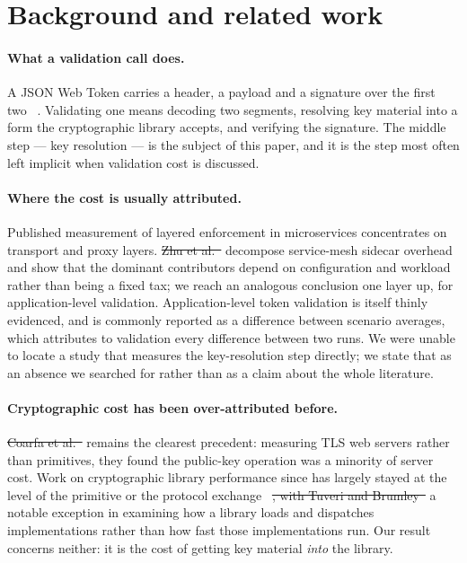 \documentclass[pdflatex,sn-basic,twocolumn]{sn-jnl}%
\providecommand{\DIFadd}[1]{{\protect\color{blue}\uwave{#1}}} %
\providecommand{\DIFdel}[1]{{\protect\color{red}\sout{#1}}}                      %
\providecommand{\DIFaddbegin}{} %
\providecommand{\DIFaddend}{} %
\providecommand{\DIFdelbegin}{} %
\providecommand{\DIFdelend}{} %
\newcommand{\DIFscaledelfig}{0.5}
\newlength{\DIFdelgraphicswidth} %
\newlength{\DIFdelgraphicsheight} %
\newcommand{\DIFaddincludegraphics}[2][]{{\color{blue}\fbox{\DIFOincludegraphics[#1]{#2}}}} %
\newcommand{\DIFdelincludegraphics}[2][]{%
\sbox{\DIFdelgraphicsbox}{\DIFOincludegraphics[#1]{#2}}%
\settoboxwidth{\DIFdelgraphicswidth}{\DIFdelgraphicsbox} %
\settoboxtotalheight{\DIFdelgraphicsheight}{\DIFdelgraphicsbox} %
\scalebox{\DIFscaledelfig}{%
\parbox[b]{\DIFdelgraphicswidth}{\usebox{\DIFdelgraphicsbox}\\[-\baselineskip] \rule{\DIFdelgraphicswidth}{0em}}\llap{\resizebox{\DIFdelgraphicswidth}{\DIFdelgraphicsheight}{%
\setlength{\unitlength}{\DIFdelgraphicswidth}%
\begin{picture}(1,1)%
\thicklines\linethickness{2pt} %
{\color[rgb]{1,0,0}\put(0,0){\framebox(1,1){}}}%
{\color[rgb]{1,0,0}\put(0,0){\line( 1,1){1}}}%
{\color[rgb]{1,0,0}\put(0,1){\line(1,-1){1}}}%
\end{picture}%
}\hspace*{3pt}}} %
} %
\DeclareRobustCommand{\DIFaddbegin}{\DIFOaddbegin \let\includegraphics\DIFaddincludegraphics} %
\DeclareRobustCommand{\DIFaddend}{\DIFOaddend \let\includegraphics\DIFOincludegraphics} %
\DeclareRobustCommand{\DIFdelbegin}{\DIFOdelbegin \let\includegraphics\DIFdelincludegraphics} %
\DeclareRobustCommand{\DIFdelend}{\DIFOaddend \let\includegraphics\DIFOincludegraphics} %
\begin{document}
\section{Background and related work}\label{sec:related}

\paragraph{What a validation call does.} A JSON Web Token carries a header, a
payload and a signature over the first two~\DIFdelbegin %
\DIFdelend \DIFaddbegin \citep{rfc7519}\DIFaddend . Validating one means
decoding two segments, resolving key material into a form the cryptographic
library accepts, and verifying the signature. The middle step --- key
resolution --- is the subject of this paper, and it is the step most often left
implicit when validation cost is discussed.

\paragraph{Where the cost is usually attributed.} Published measurement of
layered enforcement in microservices concentrates on transport and proxy
layers. \DIFdelbegin \DIFdel{Zhu et al.~}%
\DIFdelend \DIFaddbegin \citet{zhu2023dissecting} \DIFaddend decompose service-mesh sidecar
overhead and show that the dominant contributors depend on configuration and
workload rather than being a fixed tax; we reach an analogous conclusion one
layer up, for application-level validation. Application-level token validation
is itself thinly evidenced, and is commonly reported as a difference between
scenario averages, which attributes to validation every difference between two
runs. We were unable to locate a study that measures the key-resolution step
directly;
we state that as an absence we searched for rather than as a claim about the
whole literature.

\paragraph{Cryptographic cost has been over-attributed before.} \DIFdelbegin \DIFdel{Coarfa et
al.~}%
\DIFdelend \DIFaddbegin \citet{coarfa2006performance} \DIFaddend remains the clearest precedent: measuring TLS
web servers rather than primitives, they found the public-key operation was a
minority of server cost. Work on cryptographic library performance since has
largely stayed at the level of the primitive or the protocol
exchange~\DIFdelbegin %
\DIFdel{, with Tuveri and
Brumley~}%
\DIFdelend \DIFaddbegin \citep{naser2020performance,sikeridis2020assessing}\DIFadd{, with }\citet{tuveri2019engines} \DIFaddend a notable exception in examining how a library
loads and dispatches implementations rather than how fast those
implementations run. Our result concerns neither: it is the cost of getting key
material \emph{into} the library.
\end{document}
